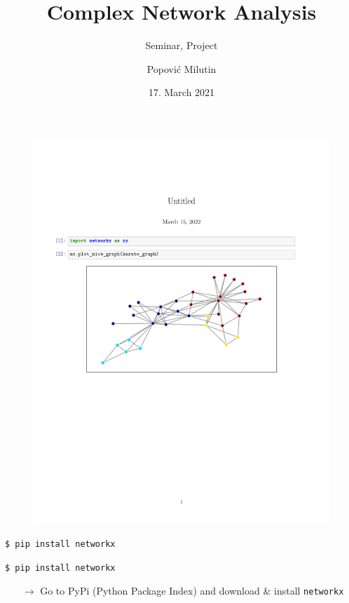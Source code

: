 \documentclass[fleqn]{beamer}
\title
{Complex Network Analysis}
\subtitle{Seminar, Project}
\author[Popović Milutin]
{Popović Milutin}
\date{17. March 2021}
\begin{document}
    \begin{frame}
        \titlepage
    \end{frame}

    \begin{frame}
        \begin{figure}[H]
            \centering
            \includegraphics[width=1.1\textwidth,
                             clip,
                             trim=0cm 10cm 0cm 7cm]
                             {./pics/code_example.pdf}
        \end{figure}
    \end{frame}

    \begin{frame}
        \centering
        \texttt{\$ pip install networkx}
        \vspace{1cm}
    \end{frame}

    \begin{frame}
        \centering
        \texttt{\$ pip install networkx}
        \vspace{1cm}
        \begin{itemize}
            \item[$\to$] Go to PyPi (Python Package Index) and download \&
                install \texttt{networkx}
        \end{itemize}
    \end{frame}
\end{document}
